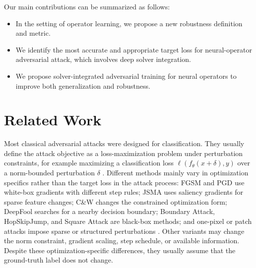 \documentclass[letterpaper]{article} %
\begin{document}
Our main contributions can be summarized as follows:
\begin{itemize}
  \item In the setting of operator learning, we propose a new robustness
  definition and metric.
  \item We identify the most accurate and appropriate target loss for
  neural-operator adversarial attack, which involves deep solver integration.
  \item We propose solver-integrated adversarial training for neural operators
  to improve both generalization and robustness.
\end{itemize}

\section{Related Work}

Most classical adversarial attacks were designed for classification. They
usually define the attack objective as a loss-maximization problem under
perturbation constraints, for example maximizing a classification loss
$\ell(f_\theta(x+\delta),y)$ over a norm-bounded perturbation $\delta$
\citep{goodfellow2015explaining,madry2018towards}. Different methods mainly
vary in optimization specifics rather than the target loss in the attack
process: FGSM and PGD use white-box gradients with different step rules; JSMA
uses saliency gradients for sparse feature changes; C\&W changes the
constrained optimization form; DeepFool searches for a nearby decision
boundary; Boundary Attack, HopSkipJump, and Square Attack are black-box
methods; and one-pixel or patch attacks impose sparse or structured
perturbations
\citep{carlini2017towards,papernot2016limitations,moosavi2016deepfool,brendel2017decision,chen2019hopskipjump,andriushchenko2019square,su2017onepixel,brown2017adversarialpatch,croce2020autoattack}.
Other variants may change the norm constraint, gradient scaling, step schedule,
or available information. Despite these optimization-specific differences, they
usually assume that the ground-truth label does not change.
\end{document}
